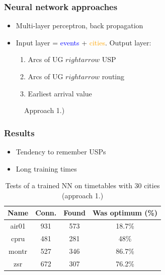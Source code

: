 \documentclass[]{beamer}
\newcommand{\inputTikZ}[1]{%
  }
\newcommand{\inputTikZ}[1]{%
    \beginpgfgraphicnamed{#1-external}%
    \endpgfgraphicnamed%
  }
\begin{document}
        \begin{frame}
            \frametitle{Neural network approaches}
			\begin{itemize}
				\item Multi-layer perceptron, back propagation
				\item Input layer = \textcolor{blue}{events} + \textcolor{orange}{cities}. Output layer:
				\begin{enumerate}
					\item Arcs of UG $rightarrow$ USP
					\item Arcs of UG $rightarrow$ routing
					\item Earliest arrival value
				\end{enumerate}
			\end{itemize}
			\begin{figure}[h]
				\scriptsize
                \begin{center}
                    \inputTikZ{./tikzpics/neural}
                \end{center}
				\caption{Approach 1.)}
            \end{figure}
        \end{frame}  
        
        \begin{frame}
            \frametitle{Results}
			\begin{itemize}
				\item Tendency to remember USPs
				\item Long training times
			\end{itemize}            
			\begin{table}{
                \scriptsize
                \begin{tabular}{c|c|c|c}
                    \hline
                    \rowcolor{tablehead}
                    \textbf{Name} & \textbf{Conn.} & \textbf{Found} & \textbf{Was optimum (\%)} \\
					\hline
					air01 & 931 & 573 & 18.7\% \\
					cpru & 481 & 281 & 48\% \\
					montr & 527 & 346 & 86.7\% \\
					zsr & 672 & 307 & 76.2\% \\
				\end{tabular}}
				\caption{Tests of a trained NN on timetables with 30 cities (approach 1.)}
            	\normalsize
			\end{table}
        \end{frame}
        
\end{document}
